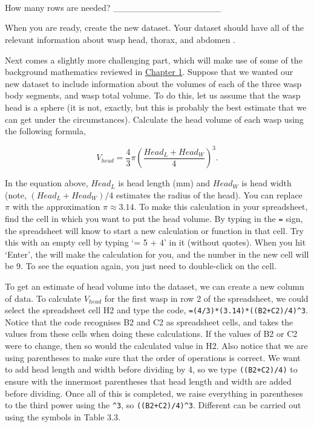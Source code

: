 \documentclass[
  openany]{krantz}
\begin{document}
\begin{verbatim}




\end{verbatim}

How many rows are needed? \_\_\_\_\_\_\_\_\_\_\_\_\_\_\_\_\_

When you are ready, create the new dataset.
Your dataset should have all of the relevant information about wasp head, thorax, and abdomen .

Next comes a slightly more challenging part, which will make use of some of the background mathematics reviewed in \protect\hyperlink{Chapter_1}{Chapter 1}.
Suppose that we wanted our new dataset to include information about the volumes of each of the three wasp body segments, and wasp total volume.
To do this, let us assume that the wasp head is a sphere (it is not, exactly, but this is probably the best estimate that we can get under the circumstances).
Calculate the head volume of each wasp using the following formula,

\[V_{head} = \frac{4}{3}\pi \left(\frac{Head_L + Head_W}{4}\right)^{3}.\]

In the equation above, \(Head_{L}\) is head length (mm) and \(Head_{W}\) is head width (note, \((Head_L + Head_W)/4\) estimates the radius of the head).
You can replace \(\pi\) with the approximation \(\pi \approx 3.14\).
To make this calculation in your spreadsheet, find the cell in which you want to put the head volume.
By typing in the \texttt{=} sign, the spreadsheet will know to start a new calculation or function in that cell.
Try this with an empty cell by typing `= 5 + 4' in it (without quotes).
When you hit `Enter', the  will make the calculation for you, and the number in the new cell will be 9.
To see the equation again, you just need to double-click on the cell.

To get an estimate of head volume into the dataset, we can create a new column of data.
To calculate \(V_{head}\) for the first wasp in row 2 of the spreadsheet, we could select the spreadsheet cell H2 and type the code, \texttt{=(4/3)*(3.14)*((B2+C2)/4)\^{}3}.
Notice that the code recognises B2 and C2 as spreadsheet cells, and takes the values from these cells when doing these calculations.
If the values of B2 or C2 were to change, then so would the calculated value in H2.
Also notice that we are using parentheses to make sure that the order of operations is correct.
We want to add head length and width before dividing by 4, so we type \texttt{((B2+C2)/4)} to ensure with the innermost parentheses that head length and width are added before dividing.
Once all of this is completed, we raise everything in parentheses to the third power using the \texttt{\^{}3}, so \texttt{((B2+C2)/4)\^{}3}.
Different  can be carried out using the symbols in Table 3.3.
\end{document}

